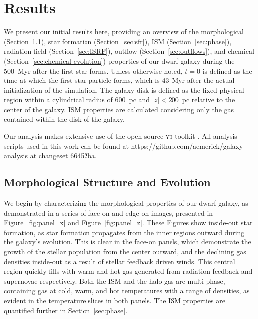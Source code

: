 \documentclass[twocolumn]{aastex61}
\begin{document}
\section{Results}
\label{sec:results}
We present our initial results here, providing an overview of the morphological (Section~\ref{sec:structure}), star formation (Section~\ref{sec:sfr}), ISM (Section~\ref{sec:phase}), radiation field (Section~\ref{sec:ISRF}), outflow (Section~\ref{sec:outflows}), and chemical (Section~\ref{sec:chemical evolution}) properties of our dwarf galaxy during the 500~Myr after the first star forms. Unless otherwise noted, $t = 0$ is defined as the time at which the first star particle forms, which is 43~Myr after the actual initialization of the simulation. The galaxy disk is defined as the fixed physical region within a cylindrical radius of 600~pc and $|z| < 200$~pc relative to the center of the galaxy. ISM properties are calculated considering only the gas contained within the disk of the galaxy.

Our analysis makes extensive use of the open-source \textsc{yt} toolkit \citep{yt}. All analysis scripts used in this work can be found at https://github.com/aemerick/galaxy-analysis at changeset 66452ba.

\subsection{Morphological Structure and Evolution}
\label{sec:structure}

We begin by characterizing the morphological properties of our dwarf galaxy, as demonstrated in a series of face-on and edge-on images, presented in Figure~\ref{fig:panel_x} and Figure~\ref{fig:panel_z}.
%
These Figures show 
inside-out star formation, as star formation propagates from the inner regions outward during the galaxy's evolution. This is clear in the face-on panels, which demonstrate the growth of the stellar population from the center outward, and the declining gas densities inside-out as a result of stellar feedback driven winds.
    This central region quickly fills with
warm and hot gas generated from radiation feedback and supernovae respectively. Both the ISM and the halo gas are multi-phase, containing gas at cold, warm, and hot temperatures with a range of densities, as evident in the temperature slices in both panels. The ISM properties are quantified further in Section~\ref{sec:phase}.
\end{document}

